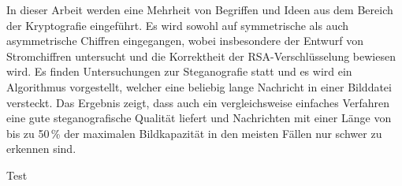 \newenvironment{abstractpage}
{\cleardoublepage\vspace*{\fill}\thispagestyle{empty}}
{\vfill\cleardoublepage}
\newenvironment{myabstract}[1]
{\bigskip\selectlanguage{#1}
  \begin{center}
    \bfseries\abstractname
  \end{center}}
{\par\bigskip}

\begin{abstractpage}
  \begin{myabstract}{german}
    In dieser Arbeit werden eine Mehrheit von Begriffen und Ideen aus dem Bereich
    der Kryptografie eingeführt. Es wird sowohl auf symmetrische als auch asymmetrische
    Chiffren eingegangen, wobei insbesondere der Entwurf von Stromchiffren
    untersucht und die Korrektheit der RSA-Verschlüsselung bewiesen wird.
    Es finden Untersuchungen zur Steganografie statt und es wird ein Algorithmus
    vorgestellt, welcher eine beliebig lange Nachricht in einer Bilddatei
    versteckt. Das Ergebnis zeigt, dass auch ein vergleichsweise einfaches Verfahren
    eine gute steganografische Qualität liefert und Nachrichten
    mit einer Länge von bis zu 50\,\% der maximalen Bildkapazität in den meisten Fällen
    nur schwer zu erkennen sind.
  \end{myabstract}
  \begin{myabstract}{english}
    Test
  \end{myabstract}
\end{abstractpage}